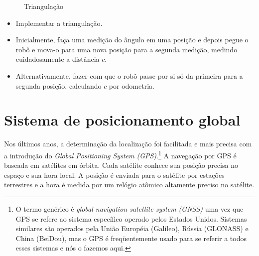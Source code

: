 \begin{figure}
\begin{center}
\caption{Triangulação}\label{fig.triangulation}
\end{center}
\end{figure}


\begin{framed}
\begin{itemize}
\item Implementar a triangulação.
\item Inicialmente, faça uma medição do ângulo em uma posição e depois pegue o robô e mova-o para uma nova posição para a segunda medição, medindo cuidadosamente a distância $c$.
\item Alternativamente, fazer com que o robô passe por si só da primeira para a segunda posição, calculando $c$ por odometria.
\end{itemize}
\end{framed}

\section{Sistema de posicionamento global}\label{s.gps}

Nos últimos anos, a determinação da localização foi facilitada e mais precisa com a introdução do \emph{Global Positioning System (GPS)}.\footnote{O termo genérico é \emph{global navigation satellite system (GNSS)} uma vez que GPS se refere ao sistema específico operado pelos Estados Unidos. Sistemas similares são operados pela União Européia (Galileo), Rússia (GLONASS) e China (BeiDou), mas o GPS é freqüentemente usado para se referir a todos esses sistemas e nós o fazemos aqui.} A navegação por GPS é baseada em satélites em órbita. Cada satélite conhece sua posição precisa no espaço e sua hora local. A posição é enviada para o satélite por estações terrestres e a hora é medida por um relógio atômico altamente preciso no satélite.

